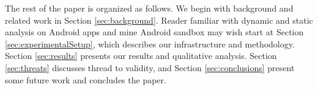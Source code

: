 The rest of the paper is organized as follows. We begin with background and related work in Section \ref{sec:background}. Reader familiar with dynamic and static analysis on Android apps and mine Android sandbox may wish start at Section \ref{sec:experimentalSetup}, which describes our infrastructure and methodology. Section \ref{sec:results} presents our results and qualitative analysis. Section \ref{sec:threats} discusses thread to validity, and Section \ref{sec:conclusions} present some future work and concludes the paper.




